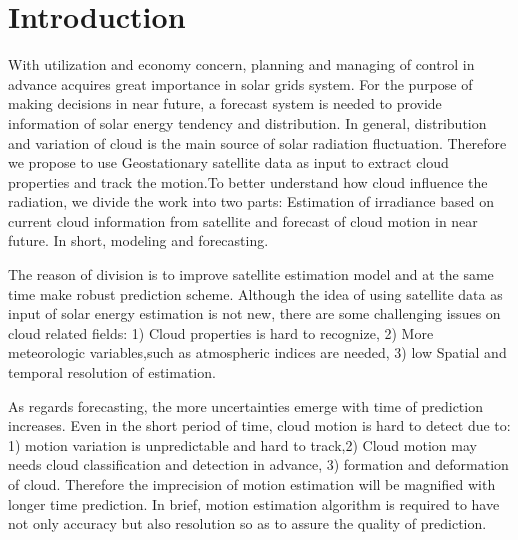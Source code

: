 \documentclass[conference]{IEEEtran}
\begin{document}




%

\section{Introduction}
\label{sec:intr}


With utilization and economy concern, planning and managing of control in
advance acquires great importance in solar grids system. For the purpose of
making decisions in near future, a forecast system is needed to provide
information of solar energy tendency and distribution. In general, distribution
and variation of cloud is the main source of solar radiation fluctuation.
Therefore we propose to use Geostationary satellite data as input to extract
cloud properties and track the motion.To better understand how cloud influence
the radiation, we divide the work into two parts: Estimation of irradiance based
on current cloud information from satellite and forecast of cloud motion in near future. In short, modeling and forecasting.  

The reason of division is to improve satellite estimation model and at the same
time make robust prediction scheme. Although the idea of using satellite
data as input of solar energy estimation is not new, there are some challenging
issues on cloud related fields: 1) Cloud properties is hard to
recognize, 2) More meteorologic
variables,such as atmospheric indices are needed, 3) low Spatial and temporal
resolution of estimation.

As regards forecasting, the more uncertainties emerge with time of prediction
increases. Even in the short period of time, cloud motion is hard to detect due
to: 1) motion variation is unpredictable and hard to track,2) Cloud motion may
needs cloud classification and detection in advance, 3) formation and
deformation of cloud. Therefore the imprecision of motion estimation
will be magnified with longer time prediction. In brief, motion estimation
algorithm is required to have not only accuracy but also resolution so as to
assure the quality of prediction.
\end{document}
